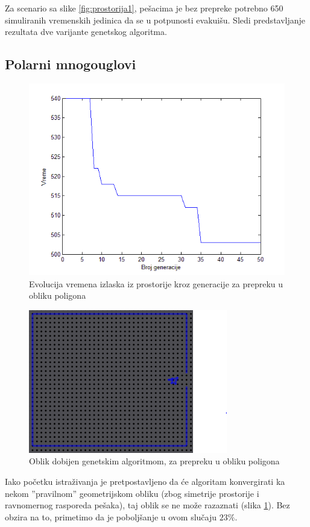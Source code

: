 \documentclass[12pt]{article}
\begin{document}
Za scenario sa slike \ref{fig:prostorija1}, pešacima je bez prepreke potrebno 650 simuliranih vremenskih jedinica da se u potpunosti evakuišu. Sledi predstavljanje rezultata dve varijante genetskog algoritma.

\subsection*{Polarni mnogouglovi}

\begin{figure}
\centering
\includegraphics[scale=.6]{polygon-plot}
\caption{Evolucija vremena izlaska iz prostorije kroz generacije za prepreku u obliku poligona}
\end{figure}

\begin{figure}[h]
\centering
\includegraphics{polygon2}
\caption{Oblik dobijen genetskim algoritmom, za prepreku u obliku poligona}
\label{fig:polygon2}
\end{figure}
Iako početku istraživanja je pretpostavljeno da će algoritam konvergirati ka nekom ''pravilnom'' geometrijskom obliku (zbog simetrije prostorije i ravnomernog rasporeda pešaka), taj oblik se ne može razaznati (slika \ref{fig:polygon2}). Bez obzira na to, primetimo da je poboljšanje u ovom slučaju $23\%$.
\end{document}
